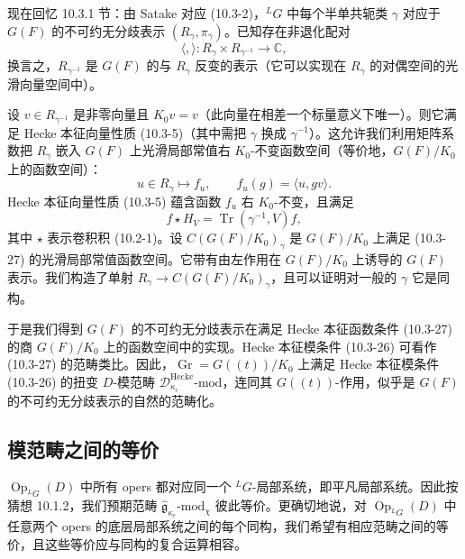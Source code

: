 
现在回忆 10.3.1 节：由 Satake 对应 (10.3-2)，${}^LG$ 中每个半单共轭类 $\gamma$ 对应于 $G(F)$ 的不可约无分歧表示 $(R_\gamma,\pi_\gamma)$。已知存在非退化配对
\[
    \langle,\rangle:R_\gamma\times R_{\gamma^{-1}}\to\mathbb{C},
\]
换言之，$R_{\gamma^{-1}}$ 是 $G(F)$ 的与 $R_\gamma$ 反变的表示（它可以实现在 $R_\gamma$ 的对偶空间的光滑向量空间中）。

设 $v\in R_{\gamma^{-1}}$ 是非零向量且 $K_0v=v$（此向量在相差一个标量意义下唯一）。则它满足 Hecke 本征向量性质 (10.3-5)（其中需把 $\gamma$ 换成 $\gamma^{-1}$）。这允许我们利用矩阵系数把 $R_\gamma$ 嵌入 $G(F)$ 上光滑局部常值右 $K_0$-不变函数空间（等价地，$G(F)/K_0$ 上的函数空间）：
\[
    u\in R_\gamma\mapsto f_u,\qquad f_u(g)=\langle u,gv\rangle.
\]
Hecke 本征向量性质 (10.3-5) 蕴含函数 $f_u$ 右 $K_0$-不变，且满足
\begin{equation}
    f\star H_V=\operatorname{Tr}(\gamma^{-1},V)f,
    \tag{10.3-27}
\end{equation}
其中 $\star$ 表示卷积积 (10.2-1)。设 $C(G(F)/K_0)_\gamma$ 是 $G(F)/K_0$ 上满足 (10.3-27) 的光滑局部常值函数空间。它带有由左作用在 $G(F)/K_0$ 上诱导的 $G(F)$ 表示。我们构造了单射 $R_\gamma\to C(G(F)/K_0)_\gamma$，且可以证明对一般的 $\gamma$ 它是同构。

于是我们得到 $G(F)$ 的不可约无分歧表示在满足 Hecke 本征函数条件 (10.3-27) 的商 $G(F)/K_0$ 上的函数空间中的实现。Hecke 本征模条件 (10.3-26) 可看作 (10.3-27) 的范畴类比。因此，$\operatorname{Gr}=G((t))/K_0$ 上满足 Hecke 本征模条件 (10.3-26) 的扭变 $D$-模范畴 $\mathcal{D}^{\text{Hecke}}_{\kappa_c}\text{-mod}$，连同其 $G((t))$-作用，似乎是 $G(F)$ 的不可约无分歧表示的自然的范畴化。

\subsection{模范畴之间的等价}

$\operatorname{Op}_{{}^LG}(D)$ 中所有 opers 都对应同一个 ${}^LG$-局部系统，即平凡局部系统。因此按猜想 10.1.2，我们预期范畴 $\hat{\mathfrak{g}}_{\kappa_c}\text{-mod}_\chi$ 彼此等价。更确切地说，对 $\operatorname{Op}_{{}^LG}(D)$ 中任意两个 opers 的底层局部系统之间的每个同构，我们希望有相应范畴之间的等价，且这些等价应与同构的复合运算相容。

